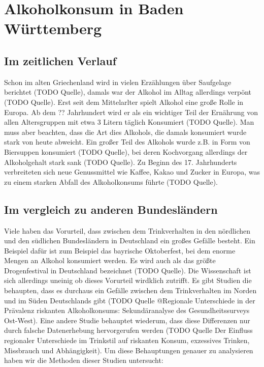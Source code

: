 \documentclass{article}
\begin{document}
\section{Alkoholkonsum in Baden Württemberg}



\subsection{Im zeitlichen Verlauf}
Schon im alten Griechenland wird in vielen Erzählungen über Saufgelage berichtet (TODO Quelle), damals war der Alkohol im Alltag allerdings verpönt (TODO Quelle). Erst seit dem Mittelarlter spielt Alkohol eine große Rolle in Europa. Ab dem ?? Jahrhundert wird er als ein wichtiger Teil der Ernährung von allen Altersgruppen mit etwa 3 Litern täglich Konsumiert (TODO Quelle). Man muss aber beachten, dass die Art dies Alkohols, die damals konsumiert wurde stark von heute abweicht. Ein großer Teil des Alkohols wurde z.B. in Form von Biersuppen konsumiert (TODO Quelle), bei deren Kochvorgang allerdings der Alkoholgehalt stark sank (TODO Quelle). Zu Beginn des 17. Jahrhunderts verbreiteten sich neue Genussmittel wie Kaffee, Kakao und Zucker in Europa, was zu einem starken Abfall des Alkoholkonsums führte (TODO Quelle). 

\subsection{Im vergleich zu anderen Bundesländern}
Viele haben das Vorurteil, dass zwischen dem Trinkverhalten in den nördlichen und den südlichen Bundesländern in Deutschland ein großes Gefälle besteht. Ein Beispiel dafür ist zum Beispiel das bayrische Oktoberfest, bei dem enorme Mengen an Alkohol konsumiert werden. Es wird auch als das größte Drogenfestival in Deutschland bezeichnet (TODO Quelle). Die Wissenschaft ist sich allerdings uneinig ob dieses Vorurteil wirdklich zutrifft. Es gibt Studien die behaupten, dass es durchaus ein Gefälle zwischen dem Trinkverhalten im Norden und im Süden Deutschlands gibt (TODO Quelle @Regionale Unterschiede in der Prävalenz riskanten Alkoholkonsums: Sekundäranalyse des Gesundheitssurveys Ost-West). Eine andere Studie behauptet wiederum, dass diese Differenzen nur durch falsche Datenerhebung hervorgerufen werden (TODO Quelle Der Einfluss regionaler Unterschiede im Trinkstil auf riskanten Konsum, exzessives Trinken, Missbrauch und Abhängigkeit). Um diese Behauptungen genauer zu analysieren haben wir die Methoden dieser Studien untersucht: 
\end{document}
